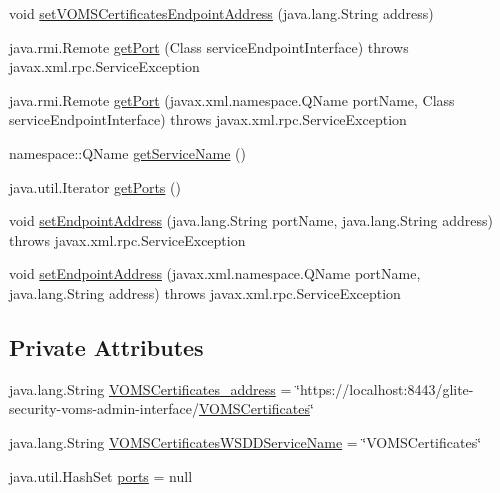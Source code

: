\begin{DoxyCompactItemize}
\item 
void \hyperlink{classorg_1_1glite_1_1security_1_1voms_1_1service_1_1certificates_1_1VOMSCertificatesServiceLocator_a82bc1bda7aa6f580b3790fae5db0758e}{setVOMSCertificatesEndpointAddress} (java.lang.String address)
\item 
java.rmi.Remote \hyperlink{classorg_1_1glite_1_1security_1_1voms_1_1service_1_1certificates_1_1VOMSCertificatesServiceLocator_aa81915dd9fe443883cbb0fa1bdde9aaa}{getPort} (Class serviceEndpointInterface)  throws javax.xml.rpc.ServiceException 
\item 
java.rmi.Remote \hyperlink{classorg_1_1glite_1_1security_1_1voms_1_1service_1_1certificates_1_1VOMSCertificatesServiceLocator_a9dbe7a84c976e66898bb6ea7eef12687}{getPort} (javax.xml.namespace.QName portName, Class serviceEndpointInterface)  throws javax.xml.rpc.ServiceException 
\item 
namespace::QName \hyperlink{classorg_1_1glite_1_1security_1_1voms_1_1service_1_1certificates_1_1VOMSCertificatesServiceLocator_a8cc15ffa2351bd8b63aa2f7fcfe09d98}{getServiceName} ()
\item 
java.util.Iterator \hyperlink{classorg_1_1glite_1_1security_1_1voms_1_1service_1_1certificates_1_1VOMSCertificatesServiceLocator_a1fd6517c5c8026b06fdc52a0420120db}{getPorts} ()
\item 
void \hyperlink{classorg_1_1glite_1_1security_1_1voms_1_1service_1_1certificates_1_1VOMSCertificatesServiceLocator_a8714f3174ce67cfcf99aa466e18df149}{setEndpointAddress} (java.lang.String portName, java.lang.String address)  throws javax.xml.rpc.ServiceException 
\item 
void \hyperlink{classorg_1_1glite_1_1security_1_1voms_1_1service_1_1certificates_1_1VOMSCertificatesServiceLocator_a86fba319f97bb49f82d5263a03a3ab48}{setEndpointAddress} (javax.xml.namespace.QName portName, java.lang.String address)  throws javax.xml.rpc.ServiceException 
\end{DoxyCompactItemize}
\subsection*{Private Attributes}
\begin{DoxyCompactItemize}
\item 
java.lang.String \hyperlink{classorg_1_1glite_1_1security_1_1voms_1_1service_1_1certificates_1_1VOMSCertificatesServiceLocator_a371d66d2ede092a1af9636928c221103}{VOMSCertificates\_\-address} = \char`\"{}https://localhost:8443/glite-\/security-\/voms-\/admin-\/interface/\hyperlink{interfaceorg_1_1glite_1_1security_1_1voms_1_1service_1_1certificates_1_1VOMSCertificates}{VOMSCertificates}\char`\"{}
\item 
java.lang.String \hyperlink{classorg_1_1glite_1_1security_1_1voms_1_1service_1_1certificates_1_1VOMSCertificatesServiceLocator_a5d515083d0068ae83a20615787bf03d3}{VOMSCertificatesWSDDServiceName} = \char`\"{}VOMSCertificates\char`\"{}
\item 
java.util.HashSet \hyperlink{classorg_1_1glite_1_1security_1_1voms_1_1service_1_1certificates_1_1VOMSCertificatesServiceLocator_ae4abc4f3f11abbfc53e870da92ceda46}{ports} = null
\end{DoxyCompactItemize}


